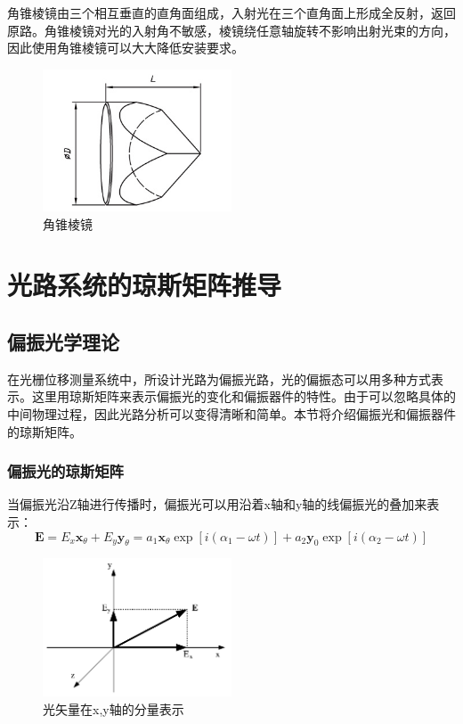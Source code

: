 \documentclass[type=master,oneside]{fduthesis}
\begin{document}
角锥棱镜由三个相互垂直的直角面组成，入射光在三个直角面上形成全反射，返回原路。角锥棱镜对光的入射角不敏感，棱镜绕任意轴旋转不影响出射光束的方向，因此使用角锥棱镜可以大大降低安装要求。
\begin{figure}[H]
  \centering
  \includegraphics[width=0.5\textwidth]{3-fig//角锥棱镜.jpg}
  \caption{角锥棱镜}
  \label{fig:角锥棱镜}
\end{figure}

\section{光路系统的琼斯矩阵推导}
\subsection{偏振光学理论}
在光栅位移测量系统中，所设计光路为偏振光路，光的偏振态可以用多种方式表示。这里用琼斯矩阵来表示偏振光的变化和偏振器件的特性。由于可以忽略具体的中间物理过程，因此光路分析可以变得清晰和简单。本节将介绍偏振光和偏振器件的琼斯矩阵。
\subsubsection{偏振光的琼斯矩阵}
当偏振光沿Z轴进行传播时，偏振光可以用沿着x轴和y轴的线偏振光的叠加来表示：
\begin{equation}
  \boldsymbol{E}=E_{x} \boldsymbol{x}_{\theta}+E_{y} \boldsymbol{y}_{\theta}=a_{1} \boldsymbol{x}_{\theta} \exp \left[i\left(\alpha_{1}-\omega t\right)\right]+a_{2} \boldsymbol{y}_{0} \exp \left[i\left(\alpha_{2}-\omega t\right)\right]
\end{equation}

\begin{figure}[H]
  \centering
  \includegraphics[width=0.5\textwidth]{3-fig//偏振光的表示.png}
  \caption{光矢量在x,y轴的分量表示}
  \label{fig:光矢量在x,y轴的分量表示}
\end{figure}
\end{document}
